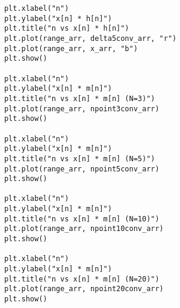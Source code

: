 \documentclass[10pt,a4paper, margin=1in]{article}
\begin{document}
\begin{enumerate}
\begin{enumerate}
\begin{verbatim}
            plt.xlabel("n")
            plt.ylabel("x[n] * h[n]")
            plt.title("n vs x[n] * h[n]")
            plt.plot(range_arr, delta5conv_arr, "r")
            plt.plot(range_arr, x_arr, "b")
            plt.show()

            plt.xlabel("n")
            plt.ylabel("x[n] * m[n]")
            plt.title("n vs x[n] * m[n] (N=3)")
            plt.plot(range_arr, npoint3conv_arr)
            plt.show()

            plt.xlabel("n")
            plt.ylabel("x[n] * m[n]")
            plt.title("n vs x[n] * m[n] (N=5)")
            plt.plot(range_arr, npoint5conv_arr)
            plt.show()

            plt.xlabel("n")
            plt.ylabel("x[n] * m[n]")
            plt.title("n vs x[n] * m[n] (N=10)")
            plt.plot(range_arr, npoint10conv_arr)
            plt.show()

            plt.xlabel("n")
            plt.ylabel("x[n] * m[n]")
            plt.title("n vs x[n] * m[n] (N=20)")
            plt.plot(range_arr, npoint20conv_arr)
            plt.show()

        \end{verbatim}
    \end{enumerate}    

\end{enumerate}
\end{document}
